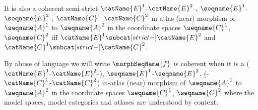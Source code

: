 \documentclass{article}
\begin{document}
\begin{definition}
It is also a coherent semi-strict
\nobreaks
  {
    {$\catName{E}^1$-$\catName{E}^2$-},
    {$\seqname{E}^1$-$\seqname{E}^2$-},
    {$\catName{C}^1$-$\catName{C}^2$}
  }
m-atlas (near) morphism of $\seqname{A}^1$ to $\seqname{A}^2$ in the
coordinate spaces $\seqname{C}^1$, $\seqname{C}^2$ iff
$\catName{E}^1 \subcat[strict-] \catName{E}^2$ and
$\catName{C}^1 \subcat[strict-] \catName{C}^2$.

By abuse of language we will write $\morphSeqName{f}$ is coherent when it
is a
\nobreaks
  {
    {($\catName{E}^1$-$\catName{E}^2$-)},
    {$\seqname{E}^1$-$\seqname{E}^2$},
    {(-$\catName{C}^1$-$\catName{C}^2$)}
  }
m-atlas (near) morphism of $\seqname{A}^1$ to $\seqname{A}^2$ in the
coordinate spaces $\seqname{C}^1$, $\seqname{C}^2$ where the model
spaces, model categories and atlases are understood by context.
\end{definition}
\end{document}
